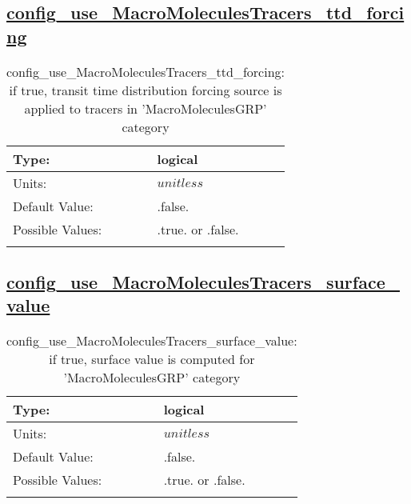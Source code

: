 \subsection[config\_use\_MacroMoleculesTracers\_ttd\_forcing]{\hyperref[sec:nm_tab_tracer_forcing_MacroMoleculesTracers]{config\_use\_MacroMoleculesTracers\_ttd\_forcing}}
\label{subsec:nm_sec_config_use_MacroMoleculesTracers_ttd_forcing}
\begin{center}
\begin{longtable}{| p{2.0in} || p{4.0in} |}
    \hline
    Type: & logical \\
    \hline
    Units: & $unitless$ \\
    \hline
    Default Value: & .false. \\
    \hline
    Possible Values: & .true. or .false. \\
    \hline
    \caption{config\_use\_MacroMoleculesTracers\_ttd\_forcing: if true, transit time distribution forcing source is applied to tracers in 'MacroMoleculesGRP' category}
\end{longtable}
\end{center}
\subsection[config\_use\_MacroMoleculesTracers\_surface\_value]{\hyperref[sec:nm_tab_tracer_forcing_MacroMoleculesTracers]{config\_use\_MacroMoleculesTracers\_surface\_value}}
\label{subsec:nm_sec_config_use_MacroMoleculesTracers_surface_value}
\begin{center}
\begin{longtable}{| p{2.0in} || p{4.0in} |}
    \hline
    Type: & logical \\
    \hline
    Units: & $unitless$ \\
    \hline
    Default Value: & .false. \\
    \hline
    Possible Values: & .true. or .false. \\
    \hline
    \caption{config\_use\_MacroMoleculesTracers\_surface\_value: if true, surface value is computed for 'MacroMoleculesGRP' category}
\end{longtable}
\end{center}

